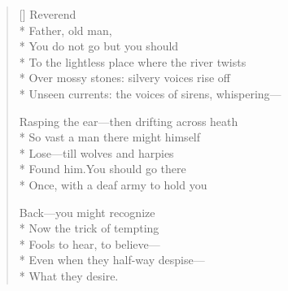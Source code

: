 \label{ch:lear_al}
\settowidth{\versewidth}{Unseen currents: the voices of sirens, whispering---}
\begin{verse}[\versewidth]
\qquad \qquad Reverend\\*
Father, old man,\\*
You do not go but you should\\*
To the lightless place where the river twists\\*
Over mossy stones: silvery voices rise off\\*
Unseen currents: the voices of sirens, whispering---

Rasping the ear---then drifting across heath\\*
So vast a man there might himself\\*
Lose---till wolves and harpies\\*
Found him.\qquad You should go there\\*
Once, with a deaf army to hold you

Back---you might recognize\\*
Now the trick of tempting\\*
Fools to hear, to believe---\\*
Even when they half-way despise---\\*
What they desire.
\end{verse}
